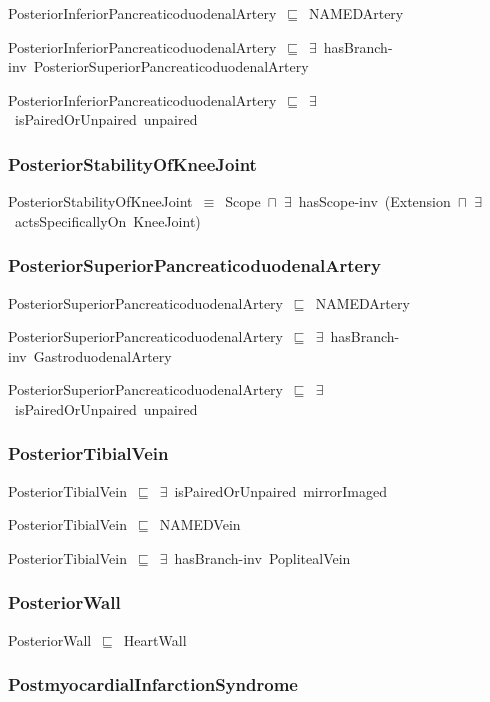 \documentclass{article}
\begin{document}
PosteriorInferiorPancreaticoduodenalArtery~\ensuremath{\sqsubseteq}~NAMEDArtery~

PosteriorInferiorPancreaticoduodenalArtery~\ensuremath{\sqsubseteq}~\ensuremath{\exists}~hasBranch-inv~PosteriorSuperiorPancreaticoduodenalArtery~

PosteriorInferiorPancreaticoduodenalArtery~\ensuremath{\sqsubseteq}~\ensuremath{\exists}~isPairedOrUnpaired~unpaired~

\subsubsection*{PosteriorStabilityOfKneeJoint}

PosteriorStabilityOfKneeJoint~\ensuremath{\equiv}~Scope~\ensuremath{\sqcap}~\ensuremath{\exists}~hasScope-inv~(Extension~\ensuremath{\sqcap}~\ensuremath{\exists}~actsSpecificallyOn~KneeJoint)

\subsubsection*{PosteriorSuperiorPancreaticoduodenalArtery}

PosteriorSuperiorPancreaticoduodenalArtery~\ensuremath{\sqsubseteq}~NAMEDArtery~

PosteriorSuperiorPancreaticoduodenalArtery~\ensuremath{\sqsubseteq}~\ensuremath{\exists}~hasBranch-inv~GastroduodenalArtery~

PosteriorSuperiorPancreaticoduodenalArtery~\ensuremath{\sqsubseteq}~\ensuremath{\exists}~isPairedOrUnpaired~unpaired~

\subsubsection*{PosteriorTibialVein}

PosteriorTibialVein~\ensuremath{\sqsubseteq}~\ensuremath{\exists}~isPairedOrUnpaired~mirrorImaged~

PosteriorTibialVein~\ensuremath{\sqsubseteq}~NAMEDVein~

PosteriorTibialVein~\ensuremath{\sqsubseteq}~\ensuremath{\exists}~hasBranch-inv~PoplitealVein~

\subsubsection*{PosteriorWall}

PosteriorWall~\ensuremath{\sqsubseteq}~HeartWall~

\subsubsection*{PostmyocardialInfarctionSyndrome}
\end{document}
